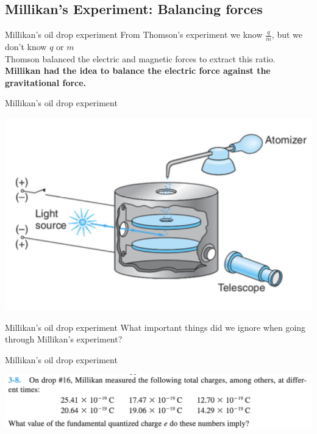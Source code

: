 
\subsection{Millikan's Experiment: Balancing forces}

\begin{frame}{Millikan's oil drop experiment}
\small
From Thomson's experiment we know $\frac{q}{m}$, but we don't know $q$ or $m$\\[3ex]

Thomson balanced the electric and magnetic forces to extract this ratio.\\[3ex]

\textbf{Millikan had the idea to balance the electric force against the gravitational force.}\\[6ex]
\end{frame}


\begin{frame}{Millikan's oil drop experiment}
\small

\includegraphics[scale=0.5]{millikan1}

\end{frame}

\begin{frame}{Millikan's oil drop experiment}
\small
What important things did we ignore when going through Millikan's experiment?\\[20ex]
\end{frame}



\begin{frame}{Millikan's oil drop experiment}
\small
\begin{center}
\includegraphics[scale=0.5]{millikan-q}
\end{center}
\vspace{5cm}
\end{frame}







